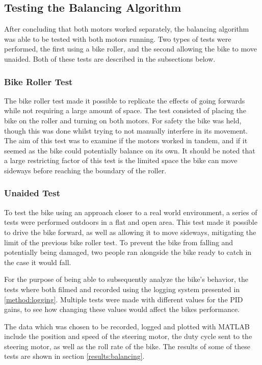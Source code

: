 \subsection{Testing the Balancing Algorithm}

After concluding that both motors worked separately, the balancing algorithm was able to be tested with both motors running. Two types of tests were performed, the first using a bike roller, and the second allowing the bike to move unaided. Both of these tests are described in the subsections below.

\subsubsection{Bike Roller Test}

The bike roller test made it possible to replicate the effects of going forwards while not requiring a large amount of space. The test consisted of placing the bike on the roller and turning on both motors. For safety the bike was held, though this was done whilst trying to not manually interfere in its movement. The aim of this test was to examine if the motors worked in tandem, and if it seemed as the bike could potentially balance on its own. It should be noted that a large restricting factor of this test is the limited space the bike can move sideways before reaching the boundary of the roller.

\subsubsection{Unaided Test}

To test the bike using an approach closer to a real world environment, a series of tests were performed outdoors in a flat and open area. This test made it possible to drive the bike forward, as well as allowing it to move sideways, mitigating the limit of the previous bike roller test. To prevent the bike from falling and potentially being damaged, two people ran alongside the bike ready to catch in the case it would fall.

For the purpose of being able to subsequently analyze the bike's behavior, the tests where both filmed and recorded using the logging system presented in \ref{method:logging}. Multiple tests were made with different values for the PID gains, to see how changing these values would affect the bikes performance. 

The data which was chosen to be recorded, logged and plotted with MATLAB include the position and speed of the steering motor, the duty cycle sent to the steering motor, as well as the roll rate of the bike. The results of some of these tests are shown in section \ref{results:balancing}.

